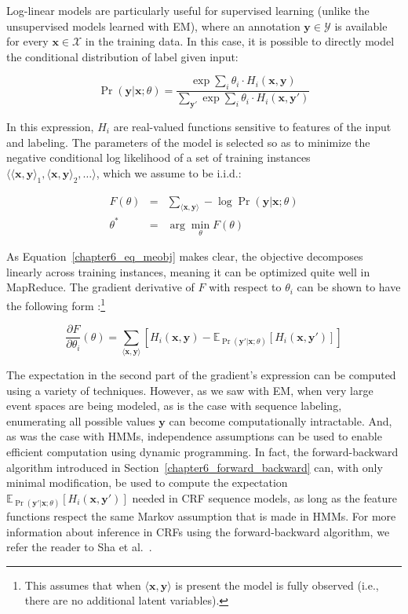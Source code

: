 Log-linear models are particularly useful for supervised learning
(unlike the unsupervised models learned with EM), where an annotation
$\textbf{y} \in \mathcal{Y}$ is available for every $\textbf{x} \in
\mathcal{X}$ in the training data.  In this case, it is possible to
directly model the conditional distribution of label given input:

\begin{equation}
\Pr(\textbf{y} | \textbf{x} ; \theta) = \frac{\exp \sum_i \theta_i \cdot H_i(\textbf{x}, \textbf{y})}{\sum_{\textbf{y}'}\exp \sum_i \theta_i \cdot H_i(\textbf{x}, \textbf{y}')}
\end{equation}

\noindent In this expression, $H_i$ are real-valued functions
sensitive to features of the input and labeling.  The parameters of
the model is selected so as to minimize the negative conditional log
likelihood of a set of training instances $\langle \langle \textbf{x}
, \textbf{y} \rangle_1 , \langle \textbf{x} , \textbf{y} \rangle_2 ,
\ldots \rangle$, which we assume to be i.i.d.:

\begin{eqnarray}
F(\theta) & = & \sum_{\langle \textbf{x} , \textbf{y} \rangle} - \log \Pr(\textbf{y} | \textbf{x} ; \theta) \label{chapter6_eq_meobj} \\
\theta^* & = & \arg \min_\theta F(\theta)
\end{eqnarray}

\noindent As Equation~\ref{chapter6_eq_meobj} makes clear, the
objective decomposes linearly across training instances, meaning it
can be optimized quite well in MapReduce.  The gradient derivative of
$F$ with respect to $\theta_i$ can be shown to have the following form
\cite{Smith_2004}:\footnote{This assumes that when $\langle
  \textbf{x}, \textbf{y} \rangle$ is present the model is fully
  observed (i.e., there are no additional latent variables).}

\begin{equation}
\frac{\partial F}{\partial \theta_i}(\theta) = \sum_{\langle \textbf{x} , \textbf{y} \rangle} \left[ H_i(\textbf{x},\textbf{y}) - \mathbb{E}_{\Pr(\textbf{y}' | \textbf{x} ; \theta)}[H_i(\textbf{x},\textbf{y}')] \right]
\end{equation}

\noindent The expectation in the second part of the gradient's
expression can be computed using a variety of techniques.  However, as
we saw with EM, when very large event spaces are being modeled, as is
the case with sequence labeling, enumerating all possible values
$\textbf{y}$ can become computationally intractable.  And, as was the
case with HMMs, independence assumptions can be used to enable
efficient computation using dynamic programming.  In fact, the
forward-backward algorithm introduced in
Section~\ref{chapter6_forward_backward} can, with only minimal
modification, be used to compute the expectation
$\mathbb{E}_{\Pr(\textbf{y}' | \textbf{x} ;
  \theta)}[H_i(\textbf{x},\textbf{y}')]$ needed in CRF sequence
models, as long as the feature functions respect the same Markov
assumption that is made in HMMs.  For more information about inference
in CRFs using the forward-backward algorithm, we refer the reader to
Sha et al.~\cite{Sha_2003}.

